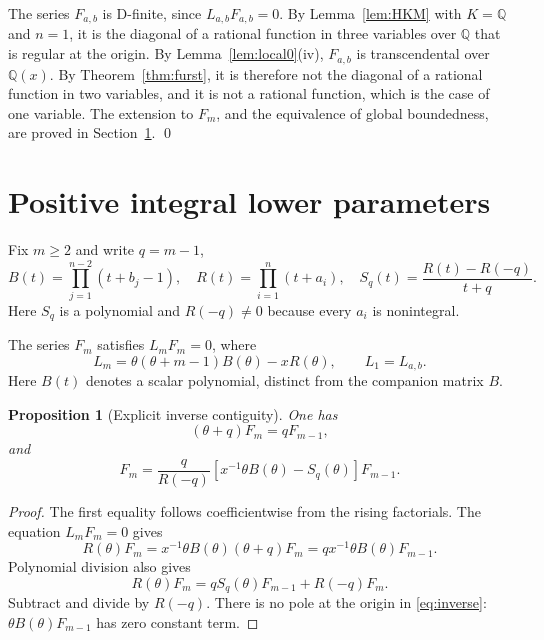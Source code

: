 \documentclass[11pt]{amsart}
\newtheorem{proposition}[theorem]{Proposition}
\theoremstyle{definition}
\theoremstyle{remark}
\numberwithin{equation}{section}
\newcommand{\Q}{\mathbb{Q}}
\newcommand{\Fab}{F_{a,b}}
\begin{document}
The series $\Fab$ is D-finite, since $L_{a,b}\Fab=0$. By Lemma~\ref{lem:HKM} with $K=\Q$ and $n=1$, it is the diagonal of a rational function in three variables over $\Q$ that is regular at the origin. By Lemma~\ref{lem:local0}(iv), $\Fab$ is transcendental over $\Q(x)$. By Theorem~\ref{thm:furst}, it is therefore not the diagonal of a rational function in two variables, and it is not a rational function, which is the case of one variable. The extension to $F_m$, and the equivalence of global boundedness, are proved in Section~\ref{sec:contiguity}. \qed

\section{Positive integral lower parameters}\label{sec:contiguity}

Fix \(m\ge2\) and write \(q=m-1\),
\[B(t)=\prod_{j=1}^{n-2}(t+b_j-1),\quad R(t)=\prod_{i=1}^{n}(t+a_i),\quad S_q(t)=\frac{R(t)-R(-q)}{t+q}.\]
Here \(S_q\) is a polynomial and \(R(-q)\ne0\) because every \(a_i\) is
nonintegral.

The series $F_m$ satisfies $L_mF_m=0$, where
\[
L_m=\theta(\theta+m-1)B(\theta)-xR(\theta),\qquad L_1=L_{a,b}.
\]
Here $B(t)$ denotes a scalar polynomial, distinct from the companion matrix $B$.

\begin{proposition}[Explicit inverse contiguity]\label{prop:inverse} One has
\[(\theta+q)F_m=qF_{m-1},\] and
\begin{equation}\label{eq:inverse} F_m=\frac{q}{R(-q)}\left[x^{-1}\theta B(\theta)-S_q(\theta)\right]F_{m-1}.\end{equation}

\end{proposition}\begin{proof} The first equality follows coefficientwise from the
rising factorials. The equation \(L_mF_m=0\) gives
\[R(\theta)F_m=x^{-1}\theta B(\theta)(\theta+q)F_m=q x^{-1}\theta B(\theta)F_{m-1}.\]
Polynomial division also gives
\[R(\theta)F_m=q S_q(\theta)F_{m-1}+R(-q)F_m.\] Subtract and divide by
\(R(-q)\). There is no pole at the origin in \eqref{eq:inverse}:
\(\theta B(\theta)F_{m-1}\) has zero constant term. \end{proof}
\end{document}
